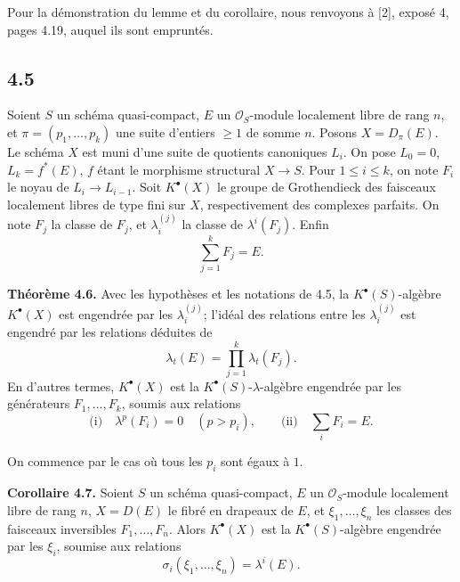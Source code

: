 \documentclass[11pt]{article}
\begin{document}
Pour la démonstration du lemme et du corollaire, nous renvoyons à [2], exposé 4, pages 4.19, auquel ils sont empruntés.

\subsection*{4.5}
Soient \(S\) un schéma quasi-compact, \(E\) un \(\mathcal O_S\)-module localement libre de rang \(n\), et \(\pi=(p_1,\ldots,p_k)\) une suite d'entiers \(\geq1\) de somme \(n\). Posons \(X=D_\pi(E)\). Le schéma \(X\) est muni d'une suite de quotients canoniques \(L_i\). On pose \(L_0=0\), \(L_k=f^*(E)\), \(f\) étant le morphisme structural \(X\to S\). Pour \(1\le i\le k\), on note \(F_i\) le noyau de \(L_i\to L_{i-1}\). Soit \(K^\bullet(X)\) le groupe de Grothendieck des faisceaux localement libres de type fini sur \(X\), respectivement des complexes parfaits. On note \(F_j\) la classe de \(F_j\), et \(\lambda_i^{(j)}\) la classe de \(\lambda^i(F_j)\). Enfin
\[
  \sum_{j=1}^{k}F_j=E.
\]

\textbf{Théorème 4.6.} Avec les hypothèses et les notations de 4.5, la \(K^\bullet(S)\)-algèbre \(K^\bullet(X)\) est engendrée par les \(\lambda_i^{(j)}\); l'idéal des relations entre les \(\lambda_i^{(j)}\) est engendré par les relations déduites de
\[
  \lambda_t(E)=\prod_{j=1}^{k}\lambda_t(F_j).
\]
En d'autres termes, \(K^\bullet(X)\) est la \(K^\bullet(S)\)-\(\lambda\)-algèbre engendrée par les générateurs \(F_1,\ldots,F_k\), soumis aux relations
\[
  \text{(i)}\quad \lambda^p(F_i)=0\quad(p>p_i),
  \qquad
  \text{(ii)}\quad \sum_i F_i=E.
\]

On commence par le cas où tous les \(p_i\) sont égaux à \(1\).

\textbf{Corollaire 4.7.} Soient \(S\) un schéma quasi-compact, \(E\) un \(\mathcal O_S\)-module localement libre de rang \(n\), \(X=D(E)\) le fibré en drapeaux de \(E\), et \(\xi_1,\ldots,\xi_n\) les classes des faisceaux inversibles \(F_1,\ldots,F_n\). Alors \(K^\bullet(X)\) est la \(K^\bullet(S)\)-algèbre engendrée par les \(\xi_i\), soumise aux relations
\[
  \sigma_i(\xi_1,\ldots,\xi_n)=\lambda^i(E).
\]
\end{document}
